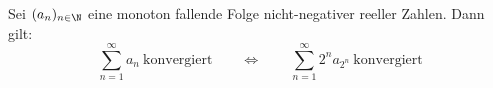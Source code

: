 Sei $(a_n)_{n \in \N}$ eine monoton fallende Folge nicht-negativer reeller Zahlen. Dann gilt:
$$\sum_{n=1}^\infty a_n \ \text{konvergiert} \qquad \Longleftrightarrow \qquad \sum_{n=1}^\infty 2^n a_{2^n} \ \text{konvergiert}$$